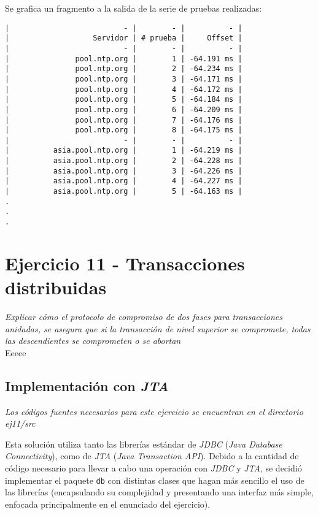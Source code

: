 Se grafica un fragmento a la salida de la serie de pruebas realizadas:

\begin{lstlisting}
|                          - |        - |          - |
|                   Servidor | # prueba |     Offset |
|                          - |        - |          - |
|               pool.ntp.org |        1 | -64.191 ms |
|               pool.ntp.org |        2 | -64.234 ms |
|               pool.ntp.org |        3 | -64.171 ms |
|               pool.ntp.org |        4 | -64.172 ms |
|               pool.ntp.org |        5 | -64.184 ms |
|               pool.ntp.org |        6 | -64.209 ms |
|               pool.ntp.org |        7 | -64.176 ms |
|               pool.ntp.org |        8 | -64.175 ms |
|                          - |        - |          - |
|          asia.pool.ntp.org |        1 | -64.219 ms |
|          asia.pool.ntp.org |        2 | -64.228 ms |
|          asia.pool.ntp.org |        3 | -64.226 ms |
|          asia.pool.ntp.org |        4 | -64.227 ms |
|          asia.pool.ntp.org |        5 | -64.163 ms |
.
.
.
\end{lstlisting}

\section{Ejercicio 11 - Transacciones distribuidas}

\emph{Explicar cómo el protocolo de compromiso de dos fases para transacciones anidadas, se asegura que si la transacción de nivel superior se compromete, todas las descendientes se comprometen o se abortan} 
~\\

Eeeee

\subsection{Implementación con \emph{JTA}}

\emph{Los códigos fuentes necesarios para este ejercicio se encuentran en el directorio \emph{ej11/src}} 

Esta solución utiliza tanto las librerías estándar de \emph{JDBC} (\emph{Java Database Connectivity}), como de \emph{JTA} (\emph{Java Transaction API}). Debido a la cantidad de código  necesario para llevar a cabo una operación con \emph{JDBC} y \emph{JTA}, se decidió implementar el paquete \texttt{db} con distintas clases que hagan más sencillo el uso de las librerías (encapsulando su complejidad y presentando una interfaz más simple, enfocada principalmente en el enunciado del ejercicio).   

